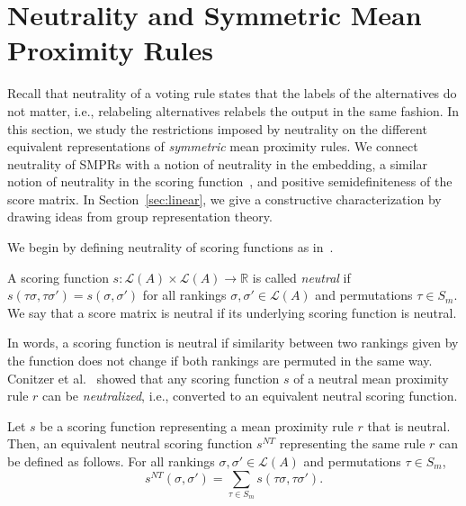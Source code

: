 \documentclass[prodmode,acmec]{ec-acmsmall}
\newcommand{\calL}{{\mathcal{L}}}
\newcommand{\rank}{{\calL(A)}}
\newcommand{\nt}{NT}
\begin{document}

\section{Neutrality and Symmetric Mean Proximity Rules}
\label{sec:neutrality}
Recall that neutrality of a voting rule states that the labels of the alternatives do not matter, i.e., relabeling alternatives relabels the output in the same fashion. In this section, we study the restrictions imposed by neutrality on the different equivalent representations of \emph{symmetric} mean proximity rules. We connect neutrality of SMPRs with a notion of neutrality in the embedding, a similar notion of neutrality in the scoring function~\cite{CRX09}, and positive semidefiniteness of the score matrix. In Section~\ref{sec:linear}, we give a constructive characterization by drawing ideas from group representation theory. 

We begin by defining neutrality of scoring functions as in~\cite{CRX09}. 

\begin{definition}
A scoring function $s: \rank \times \rank \rightarrow \mathbb{R}$ is called \emph{neutral} if $s(\tau \sigma, \tau \sigma') = s(\sigma,\sigma')$ for all rankings $\sigma,\sigma' \in \rank$ and permutations $\tau \in S_m$. We say that a score matrix is neutral if its underlying scoring function is neutral. 
\end{definition}
In words, a scoring function is neutral if similarity between two rankings given by the function does not change if both rankings are permuted in the same way. Conitzer et al.~\cite{CRX09} showed that any scoring function $s$ of a neutral mean proximity rule $r$ can be \emph{neutralized}, i.e., converted to an equivalent neutral scoring function.

\begin{proposition} Let $s$ be a scoring function representing a mean proximity rule $r$ that is neutral. Then, an equivalent neutral scoring function $s^{\nt}$ representing the same rule $r$ can be defined as follows. For all rankings $\sigma,\sigma' \in \rank$ and permutations $\tau \in S_m$, 
\begin{equation}
s^{\nt}(\sigma,\sigma') = \sum_{\tau \in S_m} s(\tau \sigma, \tau \sigma').
\label{eqn:s-nt}
\end{equation}
\label{prop:neutral-scoring}
\end{proposition}
\end{document}
